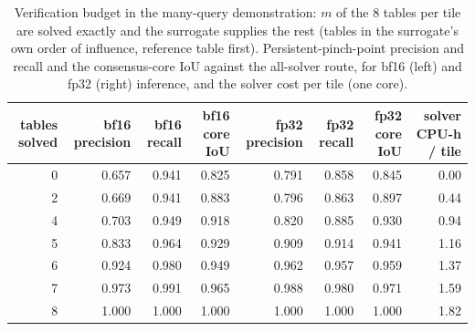\begin{table}[htbp]
\centering
\scriptsize
\setlength{\tabcolsep}{3.5pt}
\caption{Verification budget in the many-query demonstration: $m$ of the 8 tables per tile are solved exactly and the surrogate supplies the rest (tables in the surrogate's own order of influence, reference table first). Persistent-pinch-point precision and recall and the consensus-core IoU against the all-solver route, for bf16 (left) and fp32 (right) inference, and the solver cost per tile (one core).}
\label{tab:verify}
\begin{tabular}{rrrrrrrr}
\toprule
tables solved & bf16 precision & bf16 recall & bf16 core IoU & fp32 precision & fp32 recall & fp32 core IoU & solver CPU-h / tile \\
\midrule
0 & 0.657 & 0.941 & 0.825 & 0.791 & 0.858 & 0.845 & 0.00 \\
2 & 0.669 & 0.941 & 0.883 & 0.796 & 0.863 & 0.897 & 0.44 \\
4 & 0.703 & 0.949 & 0.918 & 0.820 & 0.885 & 0.930 & 0.94 \\
5 & 0.833 & 0.964 & 0.929 & 0.909 & 0.914 & 0.941 & 1.16 \\
6 & 0.924 & 0.980 & 0.949 & 0.962 & 0.957 & 0.959 & 1.37 \\
7 & 0.973 & 0.991 & 0.965 & 0.988 & 0.980 & 0.971 & 1.59 \\
8 & 1.000 & 1.000 & 1.000 & 1.000 & 1.000 & 1.000 & 1.82 \\
\bottomrule
\end{tabular}
\end{table}
